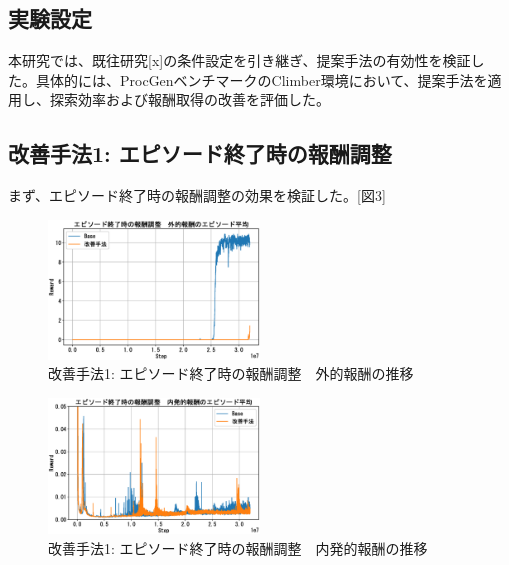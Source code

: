 \subsection{実験設定}
本研究では、既往研究[x]の条件設定を引き継ぎ、提案手法の有効性を検証した。具体的には、ProcGenベンチマークのClimber環境において、提案手法を適用し、探索効率および報酬取得の改善を評価した。

\subsection{改善手法1: エピソード終了時の報酬調整}
まず、エピソード終了時の報酬調整の効果を検証した。[図3]
\begin{figure}[t]
   \centering
   \includegraphics[width=0.5\textwidth]{Method1_Ext.eps}
   \caption{改善手法1: エピソード終了時の報酬調整　外的報酬の推移}\label{fig3:figure3}
\end{figure}
\begin{figure}[t]
   \centering
   \includegraphics[width=0.5\textwidth]{Method1_Intr.eps}
   \caption{改善手法1: エピソード終了時の報酬調整　内発的報酬の推移}\label{fig4:figure4}
\end{figure}

